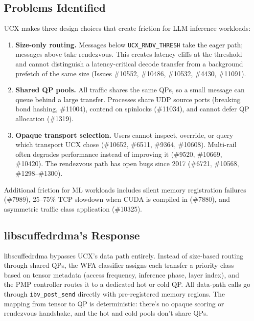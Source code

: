 \documentclass[11pt]{article}
\begin{document}
\subsection{Problems Identified}

UCX makes three design choices that create friction for LLM inference workloads:

\begin{enumerate}
    \item \textbf{Size-only routing.} Messages below \texttt{UCX\_RNDV\_THRESH} take the eager path; messages above take rendezvous. This creates latency cliffs at the threshold and cannot distinguish a latency-critical decode transfer from a background prefetch of the same size (Issues \#10552, \#10486, \#10532, \#4430, \#11091).

    \item \textbf{Shared QP pools.} All traffic shares the same QPs, so a small message can queue behind a large transfer. Processes share UDP source ports (breaking bond hashing, \#11004), contend on spinlocks (\#11034), and cannot defer QP allocation (\#1319).

    \item \textbf{Opaque transport selection.} Users cannot inspect, override, or query which transport UCX chose (\#10652, \#6511, \#9364, \#10608). Multi-rail often degrades performance instead of improving it (\#9520, \#10669, \#10420). The rendezvous path has open bugs since 2017 (\#6721, \#10568, \#1298--\#1300).
\end{enumerate}

Additional friction for ML workloads includes silent memory registration failures (\#7989), 25--75\% TCP slowdown when CUDA is compiled in (\#7880), and asymmetric traffic class application (\#10325).

\subsection{libscuffedrdma's Response}

libscuffedrdma bypasses UCX's data path entirely. Instead of size-based routing through shared QPs, the WFA classifier assigns each transfer a priority class based on tensor metadata (access frequency, inference phase, layer index), and the PMP controller routes it to a dedicated hot or cold QP. All data-path calls go through \texttt{ibv\_post\_send} directly with pre-registered memory regions. The mapping from tensor to QP is deterministic: there's no opaque scoring or rendezvous handshake, and the hot and cold pools don't share QPs.
\end{document}
